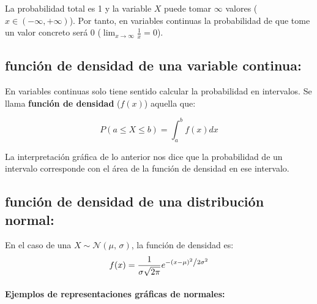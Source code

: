 La probabilidad total es 1 y la variable $X$ puede tomar $\infty$ valores ($x \in \left(-\infty, +\infty\right)$). Por tanto, en variables continuas la probabilidad de que tome un valor concreto será 0 ($\lim_{x \to \infty}\frac{1}{x}=0$).    

\subsection{función de densidad de una variable continua:}  En variables continuas solo tiene sentido calcular la probabilidad en intervalos.
Se llama \textbf{función de densidad} ($f(x)$) aquella que: 

$$P\left(a\leq X \leq b \right) = \int_{a}^{b} f(x) dx$$

La interpretación gráfica de lo anterior nos dice que la probabilidad de un intervalo corresponde con el área de la función de densidad en ese intervalo.



\subsection{función de densidad de una distribución normal:}  En el caso de una $
X \sim \mathcal{N}(\mu,\,\sigma)
    $, la función de densidad es:
    $$f(x)=\frac{1}{{\sigma \sqrt {2\pi } }}e^{{{ - \left( {x - \mu } \right)^2 } \mathord{\left/ {\vphantom {{ - \left( {x - \mu } \right)^2 } {2\sigma ^2 }}} \right. \kern-\nulldelimiterspace} {2\sigma ^2 }}}$$
\paragraph{Ejemplos de representaciones gráficas de normales:} 













